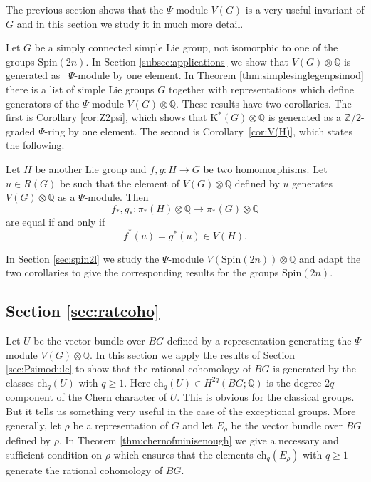 \documentclass[twoside,a4paper,reqno,11pt]{amsart}
\newcommand{\K}{\mathrm{K}}
\newcommand{\Q}{\mathbb{Q}}
\newcommand{\Z}{\mathbb{Z}}
\renewcommand{\o}{\otimes}
\newcommand{\Spin}{\mathrm{Spin}}
\newcommand{\ch}{\mathrm{ch}}
\begin{document}
The previous section shows that the $\Psi$-module $V(G)$ is a very useful invariant of $G$ and in this section we study it in much more detail. 

Let $G$ be a simply connected simple Lie group, not isomorphic to one of the groups $\Spin(2n)$. In Section \ref{subsec:applications} we show that $V(G)\o\Q$ is generated as \ $\Psi$-module by one element. In Theorem \ref{thm:simplesinglegenpsimod} there is a list of simple Lie groups $G$ together with representations which define generators of the $\Psi$-module $V(G) \otimes \Q$. These results have two corollaries. The first is Corollary \ref{cor:Z2psi}, which shows that $\K^*(G)\o\Q$ is generated as a $\Z/2$-graded $\Psi$-ring by one element. The second is Corollary~\ref{cor:V(H)}, which states the following. 

Let $H$ be another Lie group and $f, g : H \to G$ be two  homomorphisms. Let $u \in R(G)$ be such that the element of $V(G)\o\Q$ defined by $u$ generates $V(G) \otimes \Q$ as a $\Psi$-module. Then
\[ f_*,g_* : \pi_*(H)\o \Q \to \pi_*(G)\o\Q \] 
are equal if and only if 
\[ f^*(u) = g^*(u) \in V(H).\]

In Section \ref{sec:spin2l} we study the $\Psi$-module $V(\Spin(2n)) \otimes \Q$ and adapt the two corollaries to give the corresponding results for the groups $\Spin(2n)$. 

\subsection*{Section \ref{sec:ratcoho}} 

Let $U$ be the vector bundle over $BG$ defined by a representation generating the $\Psi$-module $V(G)\o\Q$. In this section we apply the results of Section \ref{sec:Psimodule} to show that the rational cohomology of $BG$ is generated by the classes $\ch_q(U)$ with $q\geq 1$.  Here $\ch_q(U) \in H^{2q}(BG; \Q)$ is the degree $2q$ component of the Chern character of $U$.  This is obvious for the classical groups. But it tells us something very useful in the case of the exceptional groups.  More generally, let $\rho$ be a representation of $G$ and let $E_{\rho}$ be the vector bundle over $BG$ defined by $\rho$. In Theorem \ref{thm:chernofminisenough} we give a necessary and sufficient condition on $\rho$ which ensures that the elements $\ch_q(E_{\rho})$ with $q \geq 1$ generate the rational cohomology of $BG$.  
\end{document}

